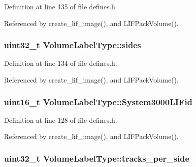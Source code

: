 Definition at line 135 of file defines.\+h.



Referenced by create\+\_\+lif\+\_\+image(), and L\+I\+F\+Pack\+Volume().

\subsubsection[{\texorpdfstring{sides}{sides}}]{\setlength{\rightskip}{0pt plus 5cm}uint32\+\_\+t Volume\+Label\+Type\+::sides}\hypertarget{structVolumeLabelType_ac1e0f088685c022ec1974cb6fa4d255c}{}\label{structVolumeLabelType_ac1e0f088685c022ec1974cb6fa4d255c}


Definition at line 134 of file defines.\+h.



Referenced by create\+\_\+lif\+\_\+image(), and L\+I\+F\+Pack\+Volume().

\subsubsection[{\texorpdfstring{System3000\+L\+I\+Fid}{System3000LIFid}}]{\setlength{\rightskip}{0pt plus 5cm}uint16\+\_\+t Volume\+Label\+Type\+::\+System3000\+L\+I\+Fid}\hypertarget{structVolumeLabelType_a08ea76c4d6e860804d6cfd24174d301f}{}\label{structVolumeLabelType_a08ea76c4d6e860804d6cfd24174d301f}


Definition at line 128 of file defines.\+h.



Referenced by create\+\_\+lif\+\_\+image(), and L\+I\+F\+Pack\+Volume().

\subsubsection[{\texorpdfstring{tracks\+\_\+per\+\_\+side}{tracks_per_side}}]{\setlength{\rightskip}{0pt plus 5cm}uint32\+\_\+t Volume\+Label\+Type\+::tracks\+\_\+per\+\_\+side}\hypertarget{structVolumeLabelType_a590051c8debbe3d157761235c0e80d79}{}\label{structVolumeLabelType_a590051c8debbe3d157761235c0e80d79}


